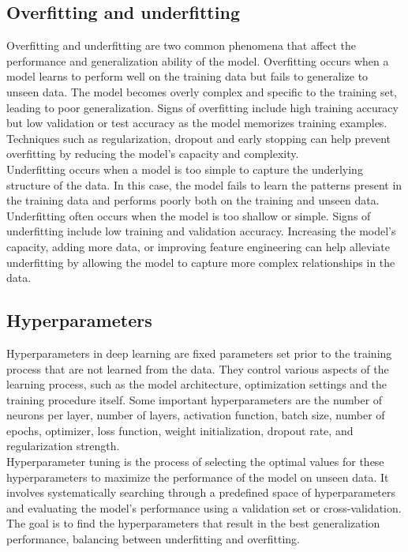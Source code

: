 \subsection{Overfitting and underfitting}
Overfitting and underfitting are two common phenomena that affect the performance and generalization ability of the model. Overfitting occurs when a model learns to perform well on the training data but fails to generalize to unseen data. The model becomes overly complex and specific to the training set, leading to poor generalization. Signs of overfitting include high training accuracy but low validation or test accuracy as the model memorizes training examples. Techniques such as regularization, dropout and early stopping can help prevent overfitting by reducing the model's capacity and complexity. \\
Underfitting occurs when a model is too simple to capture the underlying structure of the data. In this case, the model fails to learn the patterns present in the training data and performs poorly both on the training and unseen data. Underfitting often occurs when the model is too shallow or simple. Signs of underfitting include low training and validation accuracy. Increasing the model's capacity, adding more data, or improving feature engineering can help alleviate underfitting by allowing the model to capture more complex relationships in the data.
\subsection{Hyperparameters}\label{section:hyperparameters}
Hyperparameters in deep learning are fixed parameters set prior to the training process that are not learned from the data. They control various aspects of the learning process, such as the model architecture, optimization settings and the training procedure itself. Some important hyperparameters are the number of neurons per layer, number of layers, activation function, batch size, number of epochs, optimizer, loss function, weight initialization, dropout rate, and regularization strength. \\
Hyperparameter tuning is the process of selecting the optimal values for these hyperparameters to maximize the performance of the model on unseen data. It involves systematically searching through a predefined space of hyperparameters and evaluating the model's performance using a validation set or cross-validation. The goal is to find the hyperparameters that result in the best generalization performance, balancing between underfitting and overfitting.
